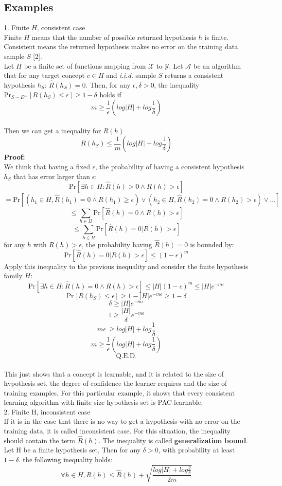 \documentclass[12pt]{article}
\theoremstyle{definition}
\theoremstyle{remark}
\numberwithin{equation}{section}
\begin{document}
\subsection{Examples}
1. Finite $H$, consistent case \\[0.2cm]
Finite $H$ means that the number of possible returned hypothesis $h$ is finite. Consistent means the returned hypothesis makes no error on the training data sample $S$ [2].\\[0.2cm]
Let $H$ be a finite set of functions mapping from $\mathcal{X}$ to $\mathcal{Y}$. Let $\mathcal{A}$ be an algorithm that for any target concept $c \in H$ and \emph{i.i.d.} sample $S$ returns a consistent hypothesis $h_{S}$: $\widehat{R}(h_S) = 0$. Then, for any $\epsilon, \delta > 0$, the inequality $\text{Pr}_{S \sim D^m}[R(h_S) \leq \epsilon] \geq 1-\delta$ holds if
\[m \geq \frac{1}{\epsilon}(log|H|+log\frac{1}{\delta})\] \\[0.2cm]
Then we can get a inequality for $R(h)$
\[R(h_S) \leq \frac{1}{m}(log|H| + log\frac{1}{\delta})\]
\textbf{Proof:}\\[0.2cm]
We think that having a fixed $\epsilon$, the probability of having a consistent hypothesis $h_S$ that has error larger than $\epsilon$:
\[\text{Pr}[\exists h \in H: \widehat{R}(h) > 0  \wedge R(h) > \epsilon]\]
\[= \text{Pr}[(h_1 \in H, \widehat{R}(h_1)=0 \wedge R(h_1) \geq \epsilon) \vee (h_2 \in H, \widehat{R}(h_2) = 0 \wedge R(h_2) > \epsilon) \vee \dots]\]
\[\leq \sum_{h\in H}\text{Pr}[\widehat{R}(h) = 0 \wedge R(h)> \epsilon]\]
\[\leq \sum_{h\in H}\text{Pr}[\widehat{R}(h) = 0 | R(h)> \epsilon]\]
for any $h$ with $R(h) > \epsilon$, the probability having $\widehat{R}(h) = 0$ is bounded by:
\[\text{Pr}[\widehat{R}(h)=0| R(h)>\epsilon] \leq (1-\epsilon)^m\] 
Apply this inequality to the previous inequality and consider the finite hypothesis family $H$:
\[\text{Pr}[\exists h \in H: \widehat{R}(h) = 0 \wedge R(h) > \epsilon] \leq |H|(1-\epsilon)^m \leq |H|e^{-m\epsilon}\]
\[\text{Pr}[R(h_S) \leq \epsilon] \geq 1 - |H|e^{-m\epsilon} \geq 1 - \delta  \]
\[\delta \geq |H|e^{-m\epsilon}\]
\[1 \geq \frac{|H|}{\delta}e^{-m\epsilon}\]
\[m\epsilon\ \geq log|H| + log\frac{1}{\delta}\]
\[m \geq \frac{1}{\epsilon} ( log|H| + log\frac{1}{\delta})\]
\[\text{Q.E.D.}\]\\[0.2cm]
This just shows that a concept is learnable, and it is related to the size of hypothesis set, the degree of confidence the learner requires and the size of training examples. For this particular example, it shows that every consistent learning algorithm with finite size hypothesis set is PAC-learnable.\\[0.2cm]
2. Finite H, inconsistent case\\[0.2cm]
If it is in the case that there is no way to get a hypothesis with no error on the training data, it is called inconsistent case. For this situation, the inequality should contain the term $\widehat{R}(h)$. The inequality is called \textbf{generalization bound}.\\[0.2cm]
Let H be a finite hypothesis set, Then for any $\delta > 0$, with probability at least $1-\delta$. the following inequality holds:
\[\forall h \in H, R(h) \leq \widehat{R}(h) + \sqrt{\frac{log|H|+log\frac{2}{\delta}}{2m}}\]
\end{document}
